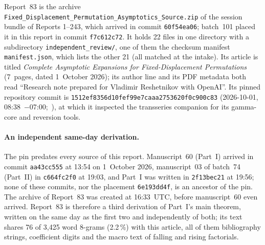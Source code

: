 \documentclass[11pt]{article}
\numberwithin{equation}{section}
\theoremstyle{definition}
\theoremstyle{remark}
\theoremstyle{definition}
\begin{document}
Report~83 is the archive
\nolinkurl{Fixed_Displacement_Permutation_Asymptotics_Source.zip} of the
session bundle of Reports 1--243, which arrived in commit
\texttt{60f54ea06}; batch~101 placed it in this report in commit
\texttt{f7c612c72}. It holds 22 files in one directory with a subdirectory
\texttt{independent\_review/}, one of them the checksum manifest
\texttt{manifest.json}, which lists the other 21 (all matched at the
intake). Its article is titled \emph{Complete Asymptotic Expansions for
Fixed-Displacement Permutations} (7~pages, dated 1~October 2026); its
author line and its PDF metadata both read ``Research note prepared for
Vladimir Reshetnikov with OpenAI''. Its pinned repository commit is
\texttt{1512ef8356d10fef99e7caaa2753620f0c900c83} (2026-10-01,
08:38~$-$07:00;~\cite{fdProveIt}), at which it inspected the transseries
companion  for its gamma-core and
reversion tools.

\paragraph{An independent same-day derivation.}
The pin predates every source of this report. Manuscript~60 (Part~I)
arrived in commit \texttt{aa43cc555} at 13:54 on 1~October 2026,
manuscript~03 of batch~74 (Part~II) in \texttt{c664fc2f0} at 19:03, and
Part~I was written in \texttt{2f13bec21} at 19:56; none of these commits,
nor the placement \texttt{6e193dd4f}, is an ancestor of the pin. The
archive of Report~83 was created at 16:33~UTC, before manuscript~60 even
arrived. Report~83 is therefore a third derivation of Part~I's main
theorem, written on the same day as the first two and independently of
both; its text shares 76 of 3{,}425 word 8-grams (2.2\,\%) with this
article, all of them bibliography strings, coefficient digits and the
macro text of falling and rising factorials.
\end{document}
